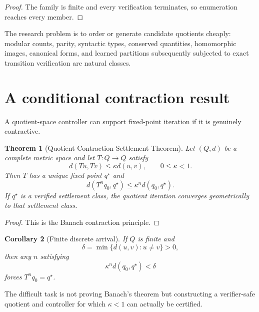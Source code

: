 \documentclass[11pt]{article}
\newtheorem{theorem}{Theorem}[section]
\newtheorem{corollary}[theorem]{Corollary}
\theoremstyle{definition}
\theoremstyle{remark}
\begin{document}
\begin{proof}
The family is finite and every verification terminates, so enumeration reaches every member.
\end{proof}

The research problem is to order or generate candidate quotients cheaply: modular counts, parity, syntactic types, conserved quantities, homomorphic images, canonical forms, and learned partitions subsequently subjected to exact transition verification are natural classes.

\section{A conditional contraction result}
A quotient-space controller can support fixed-point iteration if it is genuinely contractive.

\begin{theorem}[Quotient Contraction Settlement Theorem]
Let $(Q,d)$ be a complete metric space and let $T:Q\to Q$ satisfy
\[
d(Tu,Tv)\le\kappa d(u,v),\qquad 0\le\kappa<1.
\]
Then $T$ has a unique fixed point $q^\star$ and
\[
d(T^nq_0,q^\star)\le\kappa^n d(q_0,q^\star).
\]
If $q^\star$ is a verified settlement class, the quotient iteration converges geometrically to that settlement class.
\end{theorem}

\begin{proof}
This is the Banach contraction principle.
\end{proof}

\begin{corollary}[Finite discrete arrival]
If $Q$ is finite and
\[
\delta=\min\{d(u,v):u\ne v\}>0,
\]
then any $n$ satisfying
\[
\kappa^n d(q_0,q^\star)<\delta
\]
forces $T^nq_0=q^\star$.
\end{corollary}

The difficult task is not proving Banach's theorem but constructing a verifier-safe quotient and controller for which $\kappa<1$ can actually be certified.
\end{document}
